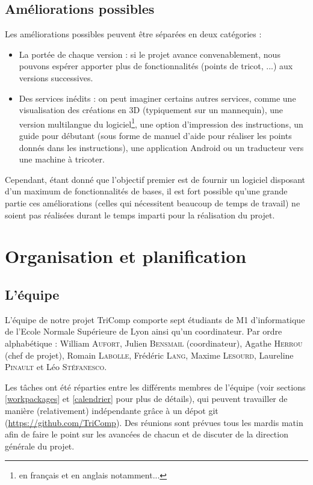 \documentclass{article}
\begin{document}
\subsection{Améliorations possibles}

Les améliorations possibles peuvent être séparées en deux catégories :
\begin{itemize}
   \item La portée de chaque version : si le projet avance convenablement, nous pouvons espérer apporter plus de fonctionnalités (points 
de tricot, ...) aux versions successives. 
   \item Des services inédits : on peut imaginer certains autres services, comme une visualisation des créations 
en 3D (typiquement sur un mannequin), une version multilangue du logiciel\footnote{en français et en anglais notamment...}, une option 
d'impression des instructions, un guide pour débutant (sous forme de manuel d'aide pour réaliser les points donnés dans les instructions), 
une application Android ou un traducteur vers une machine à tricoter.
\end{itemize}
Cependant, étant donné que l'objectif premier est de fournir un logiciel disposant d'un maximum de fonctionnalités de bases, il est fort 
possible qu'une grande partie ces améliorations (celles qui nécessitent beaucoup de temps de travail) ne soient pas réalisées durant le 
temps imparti pour la réalisation du projet.


\section{Organisation et planification}

\subsection{L'équipe}

L'équipe de notre projet TriComp comporte sept étudiants de M1 d'informatique de l'Ecole Normale Supérieure de Lyon ainsi qu'un coordinateur. Par ordre alphabétique : William \textsc{Aufort}, 
Julien \textsc{Bensmail} (coordinateur), Agathe \textsc{Herrou} (chef de projet), Romain \textsc{Labolle}, Frédéric \textsc{Lang}, Maxime 
\textsc{Lesourd}, Laureline \textsc{Pinault} et Léo \textsc{Stéfanesco}. \newline

Les tâches ont été réparties entre les différents membres de l'équipe (voir sections \ref{workpackages} et \ref{calendrier} pour plus de détails), qui peuvent travailler de manière (relativement) indépendante grâce à un dépot git (\url{https://github.com/TriComp}). Des réunions sont prévues tous les mardis matin afin de faire le point sur les avancées de chacun et de discuter de la direction générale du projet.
\end{document}
